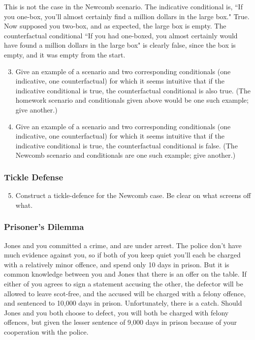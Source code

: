\documentclass[12pt,a4paper]{article}
\begin{document}
This is not the case in the Newcomb scenario. The indicative conditional is, ``If you one-box, you'll almost certainly find a million dollars in the large box." True. Now supposed you two-box, and as expected, the large box is empty. The counterfactual conditional ``If you had one-boxed, you almost certainly would have found a million dollars in the large box" is clearly false, since the box is empty, and it was empty from the start. 

\begin{enumerate}
\setcounter{enumi}{2}
\item Give an example of a scenario and two corresponding conditionals (one indicative, one counterfactual) for which it seems intuitive that if the indicative conditional is true, the counterfactual conditional is also true. (The homework scenario and conditionals given above would be one such example; give another.)
\item Give an example of a scenario and two corresponding conditionals (one indicative, one counterfactual) for which it seems intuitive that if the indicative conditional is true, the counterfactual conditional is false. (The Newcomb scenario and conditionals are one such example; give another.)
\end{enumerate}


\subsubsection*{Tickle Defense}

\begin{enumerate}
\setcounter{enumi}{4}
\item Construct a tickle-defence for the Newcomb case. Be clear on what screens off what.
\end{enumerate}

\subsubsection*{Prisoner's Dilemma}

Jones and you committed a crime, and are under arrest. The police don't have much evidence against you, so if both of you keep quiet you'll each be charged with a relatively minor offence, and spend only 10 days in prison. But it is common knowledge between you and Jones that there is an offer on the table. If either of you agrees to sign a statement accusing the other, the defector will be allowed to leave scot-free, and the accused will be charged with a felony offence, and sentenced to 10,000 days in prison. Unfortunately, there is a catch. Should Jones and you both choose to defect, you will both be charged with felony offences, but given the lesser sentence of 9,000 days in prison because of your cooperation with the police.
\end{document}
